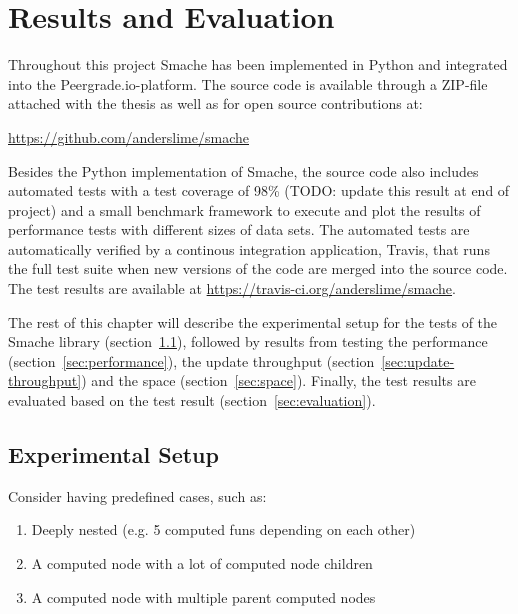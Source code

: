 \chapter{Results and Evaluation}
\label{chapter:tests-and-evaluation}

Throughout this project Smache has been implemented in Python and integrated into the Peergrade.io-platform. The source code is available through a ZIP-file attached with the thesis as well as for open source contributions at:

\url{https://github.com/anderslime/smache}

Besides the Python implementation of Smache, the source code also includes automated tests with a test coverage of 98\% (TODO: update this result at end of project) and a small benchmark framework to execute and plot the results of performance tests with different sizes of data sets. The automated tests are automatically verified by a continous integration application, Travis, that runs the full test suite when new versions of the code are merged into the source code. The test results are available at \url{https://travis-ci.org/anderslime/smache}.

The rest of this chapter will describe the experimental setup for the tests of the Smache library (section~\ref{sec:experimental-setup}), followed by results from testing the performance (section~\ref{sec:performance}), the update throughput (section~\ref{sec:update-throughput}) and the space (section~\ref{sec:space}). Finally, the test results are evaluated based on the test result (section~\ref{sec:evaluation}).


\section{Experimental Setup}
\label{sec:experimental-setup}

Consider having predefined cases, such as:

\begin{enumerate}
  \item Deeply nested (e.g. 5 computed funs depending on each other)
  \item A computed node with a lot of computed node children
  \item A computed node with multiple parent computed nodes
\end{enumerate}


